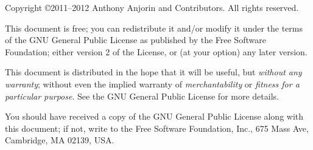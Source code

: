 \documentclass[11pt,a4paper, twoside]{book}
\begin{document}
  

\frontmatter 

\maketitle

\begin{small} 
  Copyright \copyright 2011--2012 Anthony Anjorin and Contributors. All rights
  reserved.

  This document is free; you can redistribute it and/or modify it
  under the terms of the GNU General Public License as published by
  the Free Software Foundation; either version 2 of the License, or
  (at your option) any later version.
 
  This document is distributed in the hope that it will be useful, but
  \emph{without any warranty}; without even the implied warranty of
  \emph{merchantability} or \emph{fitness for a particular purpose}.
  See the GNU General Public License for more details.
 
  You should have received a copy of the GNU General Public License
  along with this document; if not, write to the Free Software
  Foundation, Inc., 675 Mass Ave, Cambridge, MA 02139, USA.
\end{small}


\tableofcontents

\mainmatter




\end{document}
